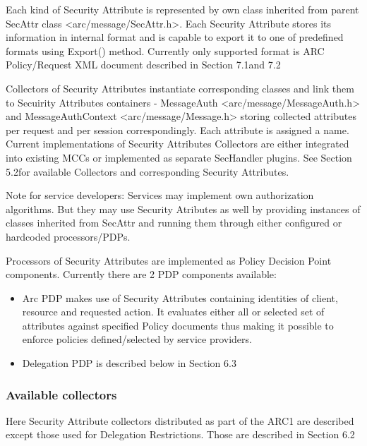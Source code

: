 \documentclass{article}
\newcommand\liststyleWWviiiNumviii{%
\renewcommand\labelitemi{[F0B7?]}
\renewcommand\labelitemii{[F081?]}
\renewcommand\labelitemiii{${\blacksquare}$}
\renewcommand\labelitemiv{[F06C?]}
}
\begin{document}
{\upshape\color{black}
Each kind of Security Attribute is represented by own class inherited
from parent SecAttr class
{\textless}arc/message/SecAttr.h{\textgreater}. Each Security Attribute
stores it{\textquotesingle}s information in internal format and is
capable to export it to one of predefined formats using Export()
method. Currently only supported format is ARC Policy/Request XML
document described in Section 7.1and 7.2}

{\upshape\color{black}
Collectors of Security Attributes instantiate corresponding classes and
link them to Secuirity Attributes containers - MessageAuth
{\textless}arc/message/MessageAuth.h{\textgreater} and
MessageAuthContext {\textless}arc/message/Message.h{\textgreater}
storing collected attributes per request and per session
correspondingly. Each attribute is assigned a name. Current
implementations of Security Attributes Collectors are either integrated
into existing MCCs or implemented as separate SecHandler plugins. See
Section 5.2for available Collectors and corresponding Security
Attributes. }

{\upshape\color{black}
Note for service developers: Services may implement own authorization
algorithms. But they may use Security Atributes as well by providing
instances of classes inherited from SecAttr and running them through
either configured or hardcoded processors/PDPs.}

{\upshape\color{black}
Processors of Security Attributes are implemented as Policy Decision
Point components. Currently there are 2 PDP components available:}

\liststyleWWviiiNumviii
\begin{itemize}
\item {\color{black}
Arc PDP makes use of Security Attributes containing identities of
client, resource and requested action. It evaluates either all or
selected set of attributes against specified Policy documents thus
making it possible to enforce policies defined/selected by service
providers. }
\item {\color{black}
Delegation PDP is described below in Section 6.3}
\end{itemize}
\subsubsection[Available collectors]{Available collectors}
\label{bkm:Ref204009636}{\upshape\color{black}
Here Security Attribute collectors distributed as part of the ARC1 are
described except those used for Delegation Restrictions. Those are
described in Section 6.2}
\end{document}
